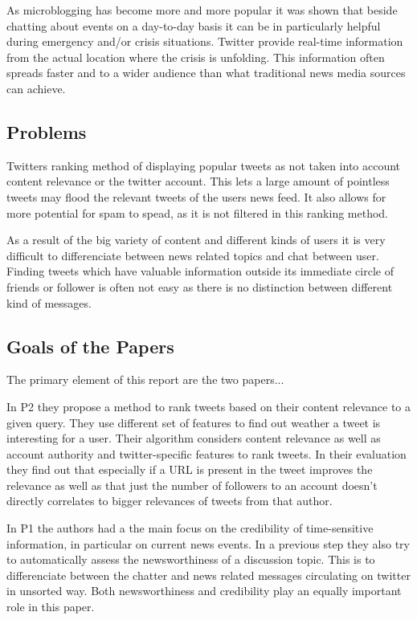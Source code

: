 \documentclass{proseminar}
\let\i\undefined
\newcommand{\i}[1]{\emph{#1}}
\begin{document}
As microblogging has become more and more popular it was shown that beside chatting about events on a day-to-day basis it can be in particularly helpful during emergency and/or crisis situations.
Twitter provide real-time information from the actual location where the crisis is unfolding. This information often spreads faster and to a wider audience than what traditional news media sources can achieve.



\subsection*{Problems}
Twitters ranking method of displaying popular tweets as not taken into account content relevance or the twitter account.
This lets a large amount of pointless tweets may flood the relevant tweets of the users news feed. It also allows for more potential for spam to spead, as it is not filtered in this ranking method.

As a result of the big variety of content and different kinds of users it is very difficult to differenciate between news related topics and chat between user. Finding tweets which have valuable information outside its immediate circle of friends or follower is often not easy as there is no distinction between different kind of messages. 



\subsection*{Goals of the Papers}
The primary element of this report are the two papers...

In P2\cite{P2} they propose a method to rank tweets based on their content relevance to a given query. They use different set of features to find out weather a tweet is interesting for a user. Their \i{learning to rank} algorithm considers content relevance as well as account authority and twitter-specific features to rank tweets. In their evaluation they find out that especially if a URL is present in the tweet improves the relevance as well as that just the number of followers to an account doesn't directly correlates to bigger relevances of tweets from that author.

In P1\cite{P1} the authors had a the main focus on the credibility of time-sensitive information, in particular on current news events. In a previous step they also try to automatically assess the newsworthiness of a discussion topic. This is to differenciate between the chatter and news related messages circulating on twitter in unsorted way. Both newsworthiness and credibility play an equally important role in this paper.
\end{document}
